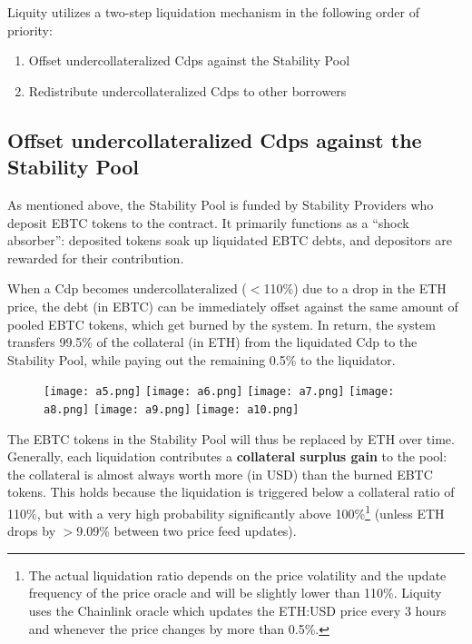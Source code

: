 \documentclass{article}
\begin{document}
Liquity utilizes a two-step liquidation mechanism in the following order of priority:
\begin{enumerate}
    \item Offset undercollateralized Cdps against the Stability Pool
    \item Redistribute undercollateralized Cdps to other borrowers
\end{enumerate}

\subsection{Offset undercollateralized Cdps against the Stability Pool}
As mentioned above, the Stability Pool is funded by Stability Providers who deposit EBTC tokens to the contract. It primarily functions as a “shock absorber”: deposited tokens soak up liquidated EBTC debts, and depositors are rewarded for their contribution. 

When a Cdp becomes undercollateralized ($<$110\%) due to a drop in the ETH price, the debt (in EBTC) can be immediately offset against the same amount of pooled EBTC tokens, which get burned by the system. In return, the system transfers 99.5\% of the collateral (in ETH) from the liquidated Cdp to the Stability Pool, while paying out the remaining 0.5\% to the liquidator.\\

\begin{figure}[h]
\centering
\texttt{[image: a5.png]}
\texttt{[image: a6.png]}
\texttt{[image: a7.png]}
\texttt{[image: a8.png]}
\texttt{[image: a9.png]}
\texttt{[image: a10.png]}
\end{figure}

The EBTC tokens in the Stability Pool will thus be replaced by ETH over time. Generally, each liquidation contributes a \textbf{collateral surplus gain} to the pool: the collateral is almost always worth more (in USD) than the burned EBTC tokens. This holds because the liquidation is triggered below a collateral ratio of 110\%, but with a very high probability significantly above 100\%\footnote{The actual liquidation ratio depends on the price volatility and the update frequency of the price oracle and will be slightly lower than 110\%. Liquity uses the Chainlink oracle which updates the ETH:USD price every 3 hours and whenever the price changes by more than 0.5\%.} (unless ETH drops by $>$9.09\% between two price feed updates).
\end{document}
